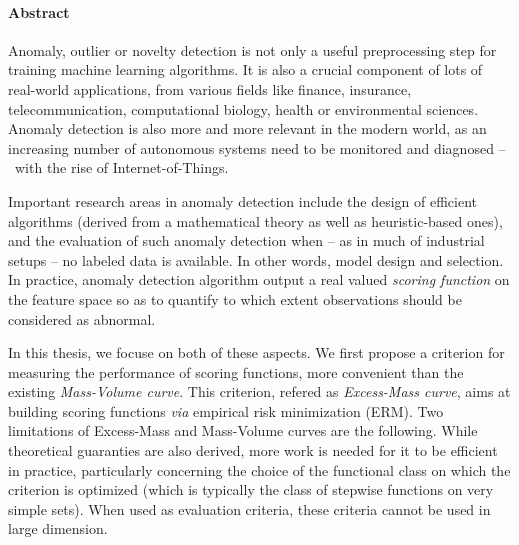 \paragraph{Abstract}

Anomaly, outlier or novelty detection is not only a useful preprocessing step for training machine learning algorithms. It is also a crucial component of lots of real-world applications, from various fields like finance, insurance, telecommunication, computational biology, health or environmental sciences. Anomaly detection is also more and more relevant in the modern world, as an increasing number of autonomous systems need to be monitored and diagnosed -- \eg~with the rise of Internet-of-Things.

Important research areas in anomaly detection include the design of efficient algorithms (derived from a mathematical theory as well as heuristic-based ones), 
and the evaluation of such anomaly detection when -- as in much of industrial setups -- no labeled data is available. 
In other words, model design and selection.
In practice, anomaly detection algorithm output a real valued \emph{scoring function} on the feature space so as to quantify to which extent observations should be considered as abnormal.

In this thesis, we focuse on both of these aspects. We first propose a criterion for measuring the performance of scoring functions, more convenient than the existing \emph{Mass-Volume curve}. %
This criterion, refered as \emph{Excess-Mass curve}, aims at building scoring functions \emph{via} empirical risk minimization (ERM).
Two limitations of Excess-Mass and Mass-Volume curves are the following.
While theoretical guaranties are also derived, more work is needed for it to be efficient in practice, particularly concerning the choice of the functional class on which the criterion is optimized (which is typically the class of stepwise functions on very simple sets). When used as evaluation criteria, these criteria cannot be used in large dimension.


